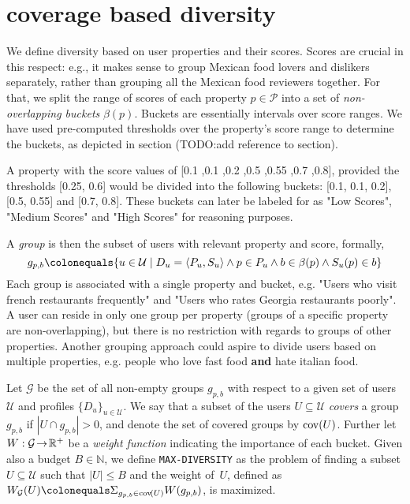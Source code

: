 \section{coverage based diversity}
\label{sec:coverage} %

We define diversity based on user properties and their scores.  
Scores are crucial in this respect: e.g., it makes sense to group Mexican food lovers and dislikers separately, rather than grouping all the Mexican food reviewers together. For that, we split the range of scores of each property $p\in\mathcal{P}$ into a set of \emph{non-overlapping buckets} $\beta(p)$. Buckets are essentially intervals over score ranges. We have used pre-computed thresholds over the property's score range to determine the buckets, as depicted in section (TODO:add reference to section).
\begin{example}
	A property with the score values of [0.1 ,0.1 ,0.2 ,0.5 ,0.55 ,0.7 ,0.8], provided the thresholds [0.25, 0.6] would be divided into the following buckets: [0.1, 0.1, 0.2], [0.5, 0.55] and [0.7, 0.8]. These buckets can later be labeled for as "Low Scores", "Medium Scores" and "High Scores" for reasoning purposes.
\end{example}

A \emph{group} is then the subset of users with relevant property and score, formally,
\[g_{p,b}\colonequals \{u\in\mathcal{U}\mid D_u=\langle P_u, S_u \rangle \wedge p\in P_u \wedge  b\in\beta(p) \wedge S_u(p)\in b\}\]
Each group is associated with a single property and bucket, e.g. "Users who visit french restaurants frequently" and "Users who rates Georgia restaurants poorly". A user can reside in only one group per property (groups of a specific property are non-overlapping), but there is no restriction with regards to groups of other properties. Another grouping approach could aspire to divide users based on multiple properties, e.g. people who love fast food \textbf{and} hate italian food. 


\begin{definition}
	Let $\mathcal{G}$ be the set of all non-empty groups $g_{p,b}$ with respect to a given set of users $\mathcal{U}$ and profiles $\{D_u\}_{u\in\mathcal{U}}$.   
	We say that a subset of the users $U\subseteq\mathcal{U}$ \emph{covers} a group $g_{p,b}$ if $|U\cap g_{p,b}|>0$, and denote the set of covered groups by $\operatorname{cov}\!\left({U}\right)$. Further let $W:\mathcal{G} \!\rightarrow\! \mathbb{R}^{+}$ be a \emph{weight function} indicating the importance of each bucket. Given also a budget $B\in \mathbb{N}$,  we define \texttt{MAX-DIVERSITY} as the problem of finding a subset $U\subseteq\mathcal{U}$ such that $|U|\leq B$ and the weight of~$U$, defined as $W_{\mathcal{G}}(U)\colonequals\Sigma_{g_{p,b} \in \funct{cov}{U}}W(g_{p,b})$, is maximized.       	
\end{definition}

